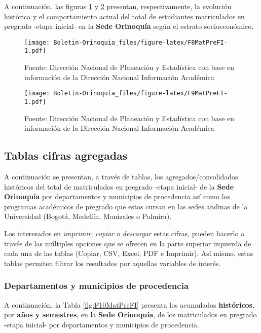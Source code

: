 \documentclass[
]{book}
\begin{document}
A continuación, las figuras \ref{fig:F8MatPreFI} y \ref{fig:F9MatPreFI} presentan, respectivamente, la evolución histórica y el comportamiento actual del total de estudiantes matriculados en pregrado -etapa inicial- en la \textbf{Sede Orinoquía} según el estrato socioeconómico.

\begin{figure}
\centering
\texttt{[image: Boletin-Orinoquia\_files/figure-latex/F8MatPreFI-1.pdf]}
\caption{\label{fig:F8MatPreFI}Fuente: Dirección Nacional de Planeación y Estadística con base en información de la Dirección Nacional Información Académica}
\end{figure}

\begin{figure}
\centering
\texttt{[image: Boletin-Orinoquia\_files/figure-latex/F9MatPreFI-1.pdf]}
\caption{\label{fig:F9MatPreFI}Fuente: Dirección Nacional de Planeación y Estadística con base en información de la Dirección Nacional Información Académica}
\end{figure}

\hypertarget{tablas-cifras-agregadas-3}{%
\subsection{Tablas cifras agregadas}\label{tablas-cifras-agregadas-3}}

A continuación se presentan, a través de tablas, los agregados/consolidados históricos del total de matriculados en pregrado -etapa inicial- de la \textbf{Sede Orinoquía} por departamentos y municipios de procedencia así como los programas académicos de pregrado que estos cursan en las sedes andinas de la Universidad (Bogotá, Medellín, Manizales o Palmira).

Los interesados en \emph{imprimir}, \emph{copiar} o \emph{descargar} estas cifras, pueden hacerlo a través de las múltiples opciones que se ofrecen en la parte superior izquierda de cada una de las tablas (Copiar, CSV, Excel, PDF e Imprimir). Así mismo, estas tablas permiten filtrar los resultados por aquellas variables de interés.

\hypertarget{departamentos-y-municipios-de-procedencia-2}{%
\subsubsection{Departamentos y municipios de procedencia}\label{departamentos-y-municipios-de-procedencia-2}}

A continuación, la Tabla \ref{fig:F10MatPreFI} presenta los acumulados \textbf{históricos}, por \textbf{años y semestres}, en la \textbf{Sede Orinoquía}, de los matriculados en pregrado -etapa inicial- por departamentos y municipios de procedencia.
\end{document}
